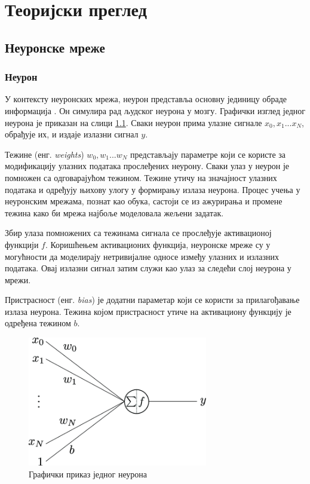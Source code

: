 \chapter{Теоријски преглед}
\label{sec:2}

\section{Неуронске мреже}
\label{sec:4}

\subsection{Неурон}
\label{sec:4}

У контексту неуронских мрежа, неурон представља основну јединицу обраде информација \cite{noauthor_artificial_20233}. 
Он симулира рад људског неурона у мозгу. Графички изглед једног неурона је приказан на слици \ref{fig:neuron}. 
Сваки неурон прима улазне сигнале $x_0, x_1 ... x_N$, обрађује их, и издаје излазни сигнал $y$.

Тежине (енг. \textit{weights}) $w_0, w_1 ... w_N$ представљају параметре који се користе за модификацију улазних података прослеђених неурону. 
Сваки улаз у неурон је помножен са одговарајућом тежином. Тежине утичу на значајност улазних података и одређују њихову улогу у формирању излаза неурона. 
Процес учења у неуронским мрежама, познат као обука, састоји се из ажурирања и промене тежина како би мрежа најбоље моделовала жељени задатак.

Збир улаза помножених са тежинама сигнала се прослеђује активационој функцији $f$. 
Коришћењем активационих функција, неуронске мреже су у могућности да моделирају нетривијалне односе између улазних и излазних података. 
Овај излазни сигнал затим служи као улаз за следећи слој неурона у мрежи.

Пристрасност (енг. \textit{bias}) је додатни параметар који се користи за прилагођавање излаза неурона. 
Тежина којом пристрасност утиче на активациону функцију је одређена тежином $b$.

\begin{figure}[h]
    \centering
    \includegraphics[width=0.7\textwidth]{images/neuron.png}
    \caption{Графички приказ једног неурона \cite{ioannou_structural_2017}}
    \label{fig:neuron}
\end{figure}

